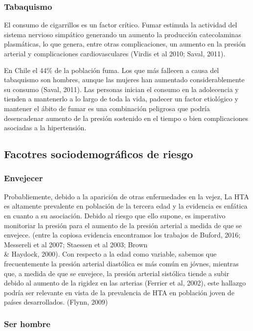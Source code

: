 \documentclass{aa}
\begin{document}
\subsubsection{Tabaquismo}

El consumo de cigarrillos es un factor crítico. Fumar estimula la actividad del sistema nervioso simpático generando un aumento la producción catecolaminas plasmáticas, lo que genera, entre otras complicaciones, un aumento en la presión arterial y complicaciones cardiovasculares (Virdis et al 2010; Saval, 2011).

En Chile el 44\% de la población fuma. Los que más fallecen a causa del tabaquismo son hombres, aunque las mujeres han aumentado considerablemente su consumo (Saval, 2011). Las personas inician el consumo en la adolecencia y tienden a mantenerlo a lo largo de toda la vida, padecer un factor etiológico y mantener el ábito de fumar es una combinación peligrosa que podría desencadenar aumento de la presión sostenido en el tiempo o bien complicaciones asociadas a la hipertensión.


\subsection{Facotres sociodemográficos de riesgo}

\subsubsection{Envejecer}

Probabliemente, debido a la aparición de otras enfermedades en la vejez, La HTA es altamente prevalente en población de la tercera edad y la evidencia es enfática en cuanto a su asociación. Debido al riesgo que ello supone, es imperativo monitoriar la presión para el aumento de la presión arterial a medida de que se envejece. (entre la copiosa evidencia encontramos los trabajos de Buford, 2016; Messereli et al 2007; Staessen et al 2003; Brown \\\& Haydock, 2000).  Con respecto a la edad como variable, sabemos que frecuentemente la presión arterial diastólica es más común en jóvnes, mientras que, a medida de que se envejece, la presión arterial sistólica tiende a subir debido al aumento de la rigidez en las arterias (Ferrier et al, 2002), este hallazgo podría ser relevante en vista de la prevalencia de HTA en población joven de países desarrollados. (Flynn, 2009)

\subsubsection{Ser hombre}
\end{document}
